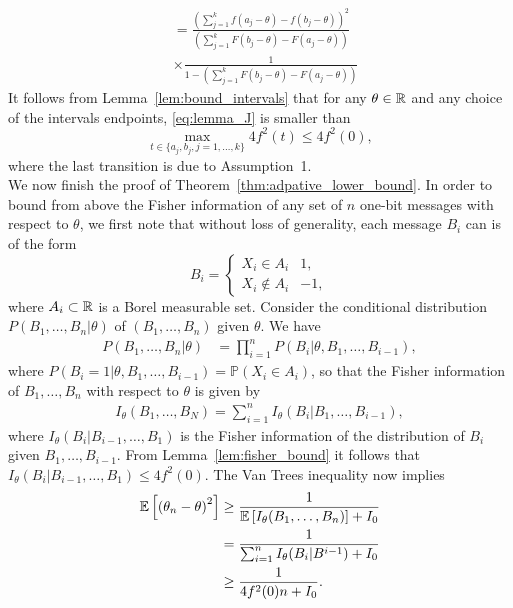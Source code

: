 \begin{align}
& =   \frac { \left( \sum_{j=1}^{k} f \left(a_j-\theta \right) - f \left( b_j-\theta \right)  \right)^2 } 
{ \left( \sum_{j=1}^k F \left( b_j-\theta \right) - F \left( a_j-\theta \right)  \right) }  \nonumber \\
& \times \frac {1} 
{1- \left( \sum_{j=1}^k F \left(  b_j-\theta \right) - F \left( a_j-\theta \right)  \right) } 
\label{eq:lemma_J}
\end{align}
It follows from Lemma~\ref{lem:bound_intervals} that for any $\theta \in \mathbb{R}$ and any choice of the intervals endpoints, \eqref{eq:lemma_J} is smaller than 
\[
\max_{t \in \{a_j,b_j, j=1,\ldots,k\} } 4f^2(t) \leq 4 f^2(0), 
\]
where the last transition is due to Assumption~1. 
\QEDA \\


We now finish the proof of Theorem~\ref{thm:adpative_lower_bound}. In order to bound from above the Fisher information of any set of $n$ one-bit messages with respect to $\theta$, we first note that without loss of generality, each message $B_i$ can is of the form
\begin{equation}
\label{eq:general_messages}
B_i = \begin{cases}
X_i \in A_i & 1, \\
X_i \notin A_i & -1,
\end{cases} 
\end{equation}
where $A_i \subset \mathbb{R}$ is a Borel measurable set. 
Consider the conditional distribution $P({B_1,\ldots,B_n|\theta})$ of $(B_1,\ldots,B_n)$ given $\theta$. We have 
\begin{align}
P\left( B_1,\ldots,B_n | \theta \right) & =  \prod_{i=1}^n P\left(B_i | \theta, B_1,\ldots,B_{i-1} \right), \label{eq:adpt_lower_bound_proof:1}
\end{align}
where $P\left(B_i =1 | \theta, B_1,\ldots,B_{i-1}  \right) = \mathbb P\left( X_i \in A_i\right)$, so that the Fisher information of $B_1,\ldots,B_n$ with respect to $\theta$ is given by 
\begin{align}
I_\theta(B_1,\ldots,B_N) = \sum_{i=1}^n I_\theta (B_i|B_1,\ldots,B_{i-1}),
\label{eq:fisher_information}
\end{align}
where $I_\theta (B_i|B_{i-1},\ldots,B_1)$ is the Fisher information of the distribution of $B_i$ given $B_1,\ldots,B_{i-1}$. From Lemma~\ref{lem:fisher_bound} it follows that $I_\theta (B_i|B_{i-1},\ldots,B_1) \leq 4f^2(0)$. The Van Trees inequality \cite{van2004detection, gill1995applications} now implies 
\begin{align*}
\mathbb{E}\left[  \left( \theta_n - \theta \right)^2\right] &  \geq \frac{1}{ \mathbb{E}\left[  I_\theta(B_1,\ldots,B_n)\right] + I_0} \\
& = \frac{1}{ \sum_{i=1}^n I_\theta (B_i | B^{i-1} ) + I_0} \\
& \geq \frac{1}{ 4f^2(0) n + I_0}.
\end{align*}
\QEDA


